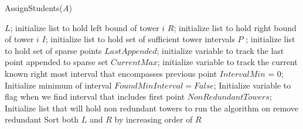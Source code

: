 \documentclass[letterpaper,11pt]{article}
\begin{document}
\begin{enumerate}
\begin{enumerate}
\begin{itemize}
\begin{algorithm}[H]
    \color{teal}
      \caption{AssignStudents($A$)} 
      $L$; initialize list to hold left bound of tower $i$ \;
      $R$; initialize list to hold right bound of tower $i$ \;
      $I $; initialize list to hold set of sufficient tower intervals \;
      $P$ ; initialize list to hold set of sparse points \;
      $LastAppended$; initialize variable to track the last point appended to sparse set \;
      $CurrentMax$; initialize variable to track the current known right most interval that encompasses previous point \;
      $IntervalMin$ = 0; Initialize minimum of interval\;
      $FoundMinInterval = False$; Initialize variable to flag when we find interval that includes first point\;
      $NonRedundantTowers$; Initialize list that will hold non redundant towers to run the algorithm on\;
      \color{red} remove redundant \color{teal} \;
      Sort both $L$ and $R$ by increasing order of $R$ \;
    \end{algorithm}



\end{itemize}
\end{enumerate}
\end{enumerate}
\end{document}
